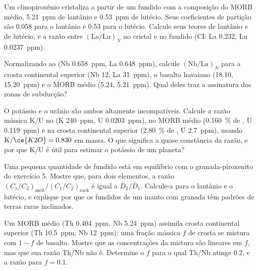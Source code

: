 \begin{exercise}[$\star\star$]\label{exo:b2:elements-in-the-earth:7}
Um clinopiroxênio cristaliza a partir de um fundido com a composição do MORB médio,
\qty{5.21}{ppm} de lantânio e \qty{0.53}{ppm} de lutécio. Seus coeficientes de
partição são 0.058 para o lantânio e 0.53 para o lutécio. Calcule seus
teores de lantânio e de lutécio, e a razão entre $(\mathrm{La}/\mathrm{Lu})_N$
no cristal e no fundido (CI: La 0.232, Lu \qty{0.0237}{ppm}).
\end{exercise}

\begin{exercise}[$\star\star$]\label{exo:b2:elements-in-the-earth:8}
Normalizando ao  (Nb \qty{0.658}{ppm}, La \qty{0.648}{ppm}),
calcule $(\mathrm{Nb}/\mathrm{La})_N$ para a crosta continental superior (Nb 12,
La \qty{31}{ppm}), o basalto havaiano (18.10, \qty{15.20}{ppm}) e o MORB médio
(5.24, \qty{5.21}{ppm}). Qual deles traz a assinatura das zonas de subducção?
\end{exercise}

\begin{exercise}[$\star\star$]\label{exo:b2:elements-in-the-earth:9}
O potássio e o urânio são ambos altamente incompatíveis. Calcule a razão mássica K/U
no  (K \qty{240}{ppm}, U \qty{0.0203}{ppm}), no MORB médio
(\qty{0.160}{\percent} de , U \qty{0.119}{ppm}) e na crosta continental superior
(\qty{2.80}{\percent} de , U \qty{2.7}{ppm}), usando
$\mathrm{K}/\ce{K2O} = 0.830$ em massa. O que significa a quase constância da razão,
e por que K/U é útil para estimar o potássio de um planeta?
\end{exercise}

\begin{exercise}[$\star\star\star$]\label{exo:b2:elements-in-the-earth:10}
Uma pequena quantidade de fundido está em equilíbrio com o granada-piroxenito do exercício
5. Mostre que, para dois elementos, a razão
$(C_1/C_2)_{\mathrm{melt}}/(C_1/C_2)_{\mathrm{rock}}$ é igual a
$\bar D_2/\bar D_1$. Calcule-a para o lantânio e o lutécio, e explique por que os
fundidos de um manto com granada têm padrões de terras raras inclinados.
\end{exercise}

\begin{exercise}[$\star\star\star$]\label{exo:b2:elements-in-the-earth:11}
Um MORB médio (Th \qty{0.404}{ppm}, Nb \qty{5.24}{ppm}) assimila crosta
continental superior (Th \qty{10.5}{ppm}, Nb \qty{12}{ppm}): uma fração mássica $f$ de
crosta se mistura com $1-f$ de basalto. Mostre que as concentrações da mistura são
lineares em $f$, mas que sua razão Th/Nb não é. Determine o $f$ para o qual Th/Nb atinge
0.2, e a razão para $f = 0.1$.
\end{exercise}

